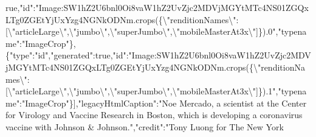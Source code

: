 rue,"id":"Image:SW1hZ2U6bnl0Oi8vaW1hZ2UvZjc2MDVjMGYtMTc4NS01ZGQxLTg0ZGEtYjUxYzg4NGNkODNm.crops(\{\textbackslash{}"renditionNames\textbackslash{}":{[}\textbackslash{}"articleLarge\textbackslash{}",\textbackslash{}"jumbo\textbackslash{}",\textbackslash{}"superJumbo\textbackslash{}",\textbackslash{}"mobileMasterAt3x\textbackslash{}"{]}\}).0","typename":"ImageCrop"\},\{"type":"id","generated":true,"id":"Image:SW1hZ2U6bnl0Oi8vaW1hZ2UvZjc2MDVjMGYtMTc4NS01ZGQxLTg0ZGEtYjUxYzg4NGNkODNm.crops(\{\textbackslash{}"renditionNames\textbackslash{}":{[}\textbackslash{}"articleLarge\textbackslash{}",\textbackslash{}"jumbo\textbackslash{}",\textbackslash{}"superJumbo\textbackslash{}",\textbackslash{}"mobileMasterAt3x\textbackslash{}"{]}\}).1","typename":"ImageCrop"\}{]},"legacyHtmlCaption":"Noe
Mercado, a scientist at the Center for Virology and Vaccine Research in
Boston, which is developing a coronavirus vaccine with Johnson \&
Johnson.","credit":"Tony Luong for The New York
